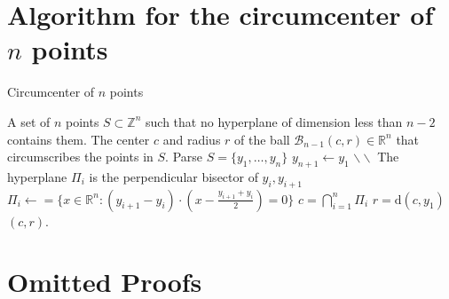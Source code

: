 \documentclass[11pt]{article}
\theoremstyle{plain}
\theoremstyle{definition}
\theoremstyle{remark}
\newcommand{\RR}{\mathbb{R}}      %
\newcommand{\ZZ}{\mathbb{Z}}      %
\begin{document}
\newpage

\appendix
\section{Algorithm for the circumcenter of $n$ points}

\begin{algorithm}
	\caption{\label{algo:Circumcenter} Circumcenter of $n$ points}
	\begin{algorithmic}[1]
		\Require A set of $n$ points $S\subset \ZZ^n$ such that no hyperplane of dimension less than $n-2$ contains them.
		\Ensure The center $c$ and radius $r$ of the ball $\mathcal{B}_{n-1}(c,r)\in \RR^n$ that circumscribes the points in $S$.
		\State Parse $S=\{y_1,\dots,y_n\}$
		\State $y_{n+1}\leftarrow y_1$
		\State $\backslash \backslash$ The hyperplane $\Pi_i$ is the perpendicular bisector of $y_i,y_{i+1}$
		\State $\Pi_i\leftarrow =\{x\in\RR^n:(y_{i+1}-y_i)\cdot (x-\frac{y_{i+1}+y_i}{2})=0\}$
		\EndFor
		\State $c=\bigcap_{i=1}^n \Pi_i$
		\State $r=\mathrm{d}(c,y_1)$
		\State \Return $(c,r)$.
		\EndFunction
		\end{algorithmic}
		\end{algorithm}

\section{Omitted Proofs}
\label{app:proofs}
\end{document}
